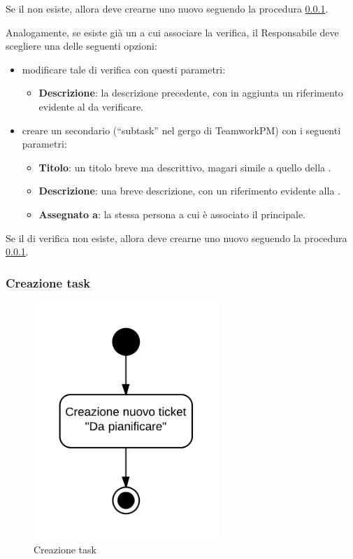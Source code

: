 Se il  non esiste, allora deve crearne uno nuovo seguendo la procedura \ref{creazionetask}.

Analogamente, se esiste già un  a cui associare la verifica, il Responsabile deve scegliere una delle seguenti opzioni:
\begin{itemize}
 \item modificare tale  di verifica con questi parametri:
	\begin{itemize}
		\item \textbf{Descrizione}: la descrizione precedente, con in aggiunta un riferimento evidente al  da verificare.
	\end{itemize}
 \item creare un  secondario (``subtask'' nel gergo di TeamworkPM) con i seguenti parametri:
	\begin{itemize}
		\item \textbf{Titolo}: un titolo breve ma descrittivo, magari simile a quello della .
		\item \textbf{Descrizione}: una breve descrizione, con un riferimento evidente alla .
		\item \textbf{Assegnato a}: la stessa persona a cui è associato il  principale.
	\end{itemize}
\end{itemize}

Se il  di verifica non esiste, allora deve crearne uno nuovo seguendo la procedura \ref{creazionetask}.

\subsubsection{Creazione task}
\label{creazionetask}

\begin{figure}[H]
    \centering
    \includegraphics[width=7cm]{uml-processi/creazione_task.png}
    \caption{Creazione task}
\end{figure}


